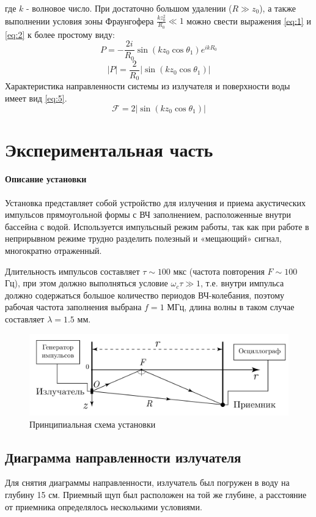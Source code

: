 где $k$ - волновое число. При достаточно большом удалении ($R\gg z_0$), а также выполнении условия зоны Фраунгофера
$\frac{k z_0^2}{R_0}\ll 1$ можно свести выражения \eqref{eq:1} и \eqref{eq:2} к более простому виду:
\begin{equation}
	P = -\frac{2i}{R_0}\sin(k z_0 \cos \theta_1 )e^{ikR_0}
	\label{eq:3}
\end{equation}
\begin{equation}
	|P| = \frac{2}{R_0}|\sin (k z_0 \cos \theta_1)|
	\label{eq:4}
\end{equation}
Характеристика направленности системы из излучателя и поверхности воды имеет вид \eqref{eq:5}.
\begin{equation}
	\mathcal{F} = 2 |\sin(k z_0 \cos \theta_1)|
	\label{eq:5}
\end{equation}


\newpage
\section{Экспериментальная часть}
\paragraph{Описание установки}
Установка представляет собой устройство для излучения и приема акустических импульсов прямоугольной формы с ВЧ
заполнением, расположенные внутри бассейна с водой. Используется импульсный режим работы, так как при работе в
неприрывном режиме трудно разделить полезный и «мещающий» сигнал, многократно отраженный.

Длительность импульсов составляет $\tau \sim 100$ мкс (частота повторения $F\sim 100$ Гц), при этом должно
выполняться условие $\omega_c \tau \gg 1$, т.е. внутри импульса должно содержаться большое количество периодов
ВЧ-колебания, поэтому рабочая частота заполнения выбрана $f = 1$ МГц, длина волны в таком случае составляет $\lambda = 1.5$ мм.
\begin{figure}[h!]
	\centering
	\includegraphics[width =0.7\linewidth]{fig/scheme0.pdf}
	\caption{Принципиальная схема установки}

\end{figure}
\subsection{Диаграмма направленности излучателя}
Для снятия диаграммы направленности, излучатель был погружен в воду на глубину 15 см. Приемный щуп был расположен на той
же глубине, а расстояние от приемника определялось несколькими условиями.

